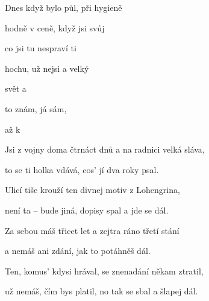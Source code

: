 

\zs
Dnes  když bylo půl, při  hygieně

 hodně v ceně, když jsi  svůj 

 co jsi  tu  nespraví ti 

 hochu,  už nejsi  a velký 
\ks

\zr
{} svět a 

to  znám, já  sám,

   

až    k 
\kr

\zs
Jsi z vojny doma čtrnáct dnů a na radnici velká sláva,

to se ti holka vdává, cos' jí dva roky psal.

Ulicí tiše krouží ten divnej motiv z Lohengrina,

není ta -- bude jiná, dopisy spal a jde se dál.
\ks

\zr\kr

\zs
Za sebou máš třicet let a zejtra ráno třetí stání

a nemáš ani zdání, jak to potáhněš dál.

Ten, komus' kdysi hrával, se znenadání někam ztratil,

už nemáš, čím bys platil, no tak se sbal a šlapej dál.
\ks

\zr\kr

\kp
